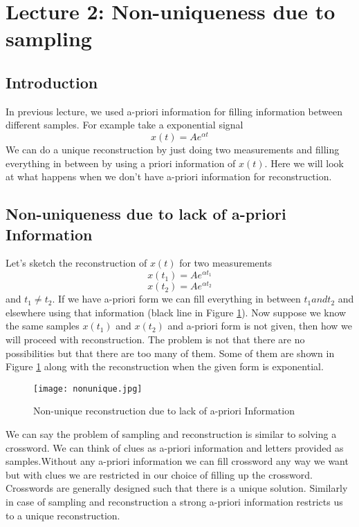 \section{Lecture 2: Non-uniqueness due to sampling}

\subsection{Introduction}
In previous lecture, we used a-priori information for filling information between different samples. For example take a exponential signal $$x(t) = Ae^{\alpha t}$$ We can do a unique reconstruction by just doing two measurements and filling everything in between by using a priori information of $x(t)$. Here we will look at what happens when we don't have a-priori information for reconstruction. 

\subsection{Non-uniqueness due to lack of a-priori Information}

Let's sketch the reconstruction of $x(t)$ for two measurements $$x(t_{1})= Ae^{\alpha t_{1}}$$ $$x(t_{2})= Ae^{\alpha t_{2}}$$  and $t_{1}\neq t_{2}$. If we have a-priori form we can fill everything in between $t_{1} and t_{2}$ and elsewhere using that information (black line in Figure \ref{fig:nonunique}). Now suppose we know the same samples $x(t_{1})$ and $x(t_{2})$ and a-priori form is not given, then how we will proceed with reconstruction. The problem is not that there are no possibilities but that there are too many of them. Some of them are shown in Figure \ref{fig:nonunique} along with the reconstruction when the given form is exponential. 

\begin{figure}[ht]
\centering
\texttt{[image: nonunique.jpg]}
\caption{\label{fig:nonunique}Non-unique reconstruction due to lack of a-priori Information}
\end{figure}

We can say the problem of sampling and reconstruction is similar to solving a crossword. We can think of clues as a-priori information and letters provided as samples.Without any a-priori information we can fill crossword any way we want but with clues we are restricted in our choice of filling up the crossword. Crosswords are generally designed such that there is a unique solution. Similarly in case of sampling and reconstruction a strong a-priori information restricts us to a unique reconstruction. 

